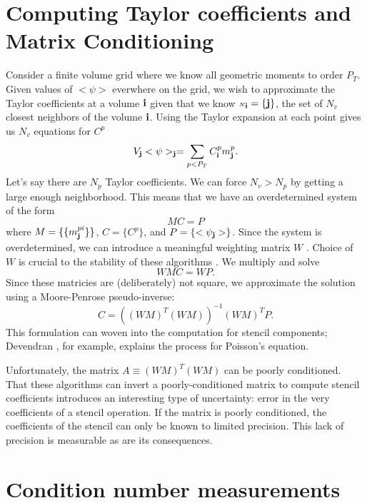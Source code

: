 \documentclass{article}
\newcommand{\ibold}{{\bf i}}
\newcommand{\jbold}{{\bf j}}
\newcommand{\cn}{{\scriptscriptstyle N}}
\begin{document}
\section{Computing Taylor coefficients and Matrix Conditioning}

Consider a finite volume grid where we know all geometric moments to
order $P_T$.  Given values of $<\psi>$ everwhere on the grid, we wish to
approximate the Taylor coefficients at a volume $\ibold$ given that we
know $\cn_\ibold = \{\jbold\}$, the set of $N_v$ closest neighbors of
the volume $\ibold$.  Using the Taylor expansion at each point gives
us $N_v$ equations for $C^p$
\begin{equation}
  V_\jbold <\psi>_\jbold = \sum\limits_{p < P_T} C^p_\ibold m^p_\jbold.
\end{equation}
Let's say there are $N_p$ Taylor coefficients.  We can force $N_v >
N_p$ by getting a large enough neighborhood.  This means that we have
an overdetermined system of the form
\begin{equation*}
M C = P 
\end{equation*}
where $M = \{\{m^{pi}_\jbold\}\}$, $C=\{C^p\}$,  and $P= \{<\psi_\jbold>\}$.
Since the system is overdetermined, we can introduce a 
meaningful weighting matrix $W$ \footnotemark[3].  Choice of $W$
is crucial to the stability of these algorithms
\footnotemark[4].
We multiply and solve
\begin{equation*}
WMC = WP.
\end{equation*}
Since these matricies are (deliberately) not square, we approximate
the solution using a Moore-Penrose pseudo-inverse:
\begin{equation}
  C = ((WM)^T(WM))^{-1} (WM)^T P.
\label{eqn::getC}  
\end{equation}
This formulation can woven into the computation for stencil
components;  Devendran \cite{Dendran2017}, for example, explains the
process for Poisson's equation.

Unfortunately, the matrix $A \equiv (WM)^T(WM)$ can be poorly conditioned.
That these algorithms can invert a poorly-conditioned matrix to compute
stencil coefficients introduces an interesting type of uncertainty: error in
the very coefficients of a stencil operation.   If the matrix is poorly
conditioned, the coefficients of the stencil can only be known to
limited precision.   This lack of precision is measurable as are its
consequences.

\section{Condition number measurements}
\end{document}
